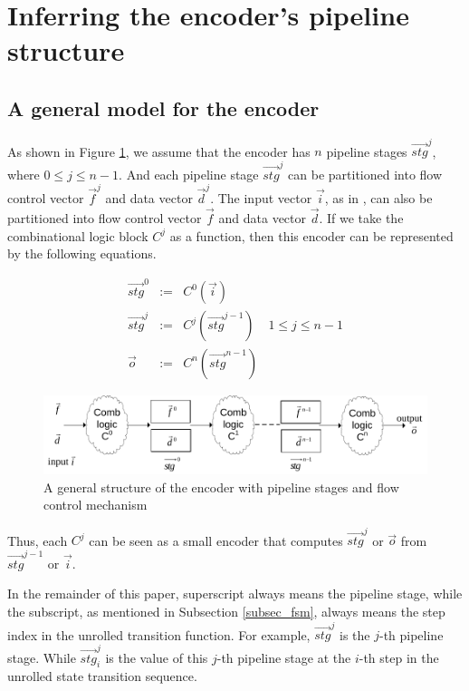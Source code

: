 \documentclass[runningheads,a4paper,orivec]{llncs}
\begin{document}
\section{Inferring the encoder's pipeline structure}\label{sec_pipeinfer}

\subsection{A general model for the encoder}
As shown in Figure \ref{fig_pipeenc},
we assume that 
the encoder has $n$ pipeline stages $\vec{stg}^j$,
where $0\le j \le n-1$.
And each pipeline stage $\vec{stg}^j$ can be partitioned into flow control vector $\vec{f}^j$ and data vector $\vec{d}^j$.
The input vector $\vec{i}$,
as in \cite{QinTODAES15},
can also be partitioned into flow control vector $\vec{f}$ and data vector $\vec{d}$.
If we take the combinational logic block $C^j$ as a function,
then this encoder can be represented by the following equations.

\begin{equation}\label{equ_genpipe}
\begin{array}{cccc}
\vec{stg}^0   & := & C^0(\vec{i})         &\\
\vec{stg}^j   & := & C^j(\vec{stg}^{j-1}) & 1\le j\le n-1\\
\vec{o}       & := & C^n(\vec{stg}^{n-1}) &
\end{array}
\end{equation}


\begin{figure}[b]
\begin{center}
\includegraphics[width=\textwidth]{pipemod1}
\end{center}
\caption{A general structure of the encoder with pipeline stages and flow control mechanism}
  \label{fig_pipeenc}
\end{figure}


Thus,
each $C^j$ can be seen as a small encoder that computes $\vec{stg}^j$ or $\vec{o}$
from $\vec{stg}^{j-1}$ or $\vec{i}$.

In the remainder of this paper,
superscript always means the pipeline stage,
while the subscript,
as mentioned in Subsection \ref{subsec_fsm},
always means the step index in the unrolled transition function.
For example,
$\vec{stg}^j$ is the $j$-th pipeline stage.
While $\vec{stg}^j_i$ is the value of this $j$-th pipeline stage 
at the $i$-th step in the unrolled state transition sequence.
\end{document}
